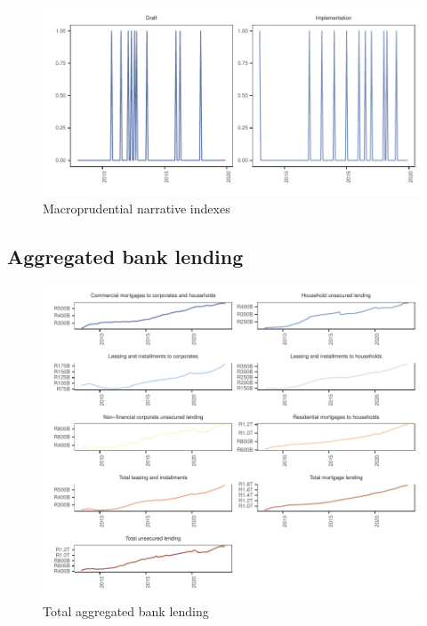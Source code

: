 \documentclass[
  letterpaper,
  DIV=11,
  numbers=noendperiod]{scrartcl}
\begin{document}
\begin{figure}[H]

{\centering \includegraphics{UP_paper_files/figure-pdf/fig-macro_narrative_indexes-1.pdf}

}

\caption{\label{fig-macro_narrative_indexes}Macroprudential narrative
indexes}

\end{figure}

\newpage

\hypertarget{aggregated-bank-lending}{%
\subsection{Aggregated bank lending}\label{aggregated-bank-lending}}

\begin{figure}[H]

{\centering \includegraphics{UP_paper_files/figure-pdf/fig-bank_lending-1.pdf}

}

\caption{\label{fig-bank_lending}Total aggregated bank lending}

\end{figure}
\end{document}

